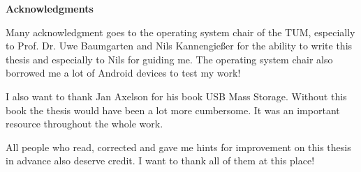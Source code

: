 \clearemptydoublepage
{}
{}	



\vspace*{2cm}

\begin{center}
{\Large \bf Acknowledgments}
\end{center}

\vspace{1cm}

Many acknowledgment goes to the operating system chair of the TUM, especially to Prof. Dr. Uwe Baumgarten and Nils Kannengie{\ss}er for the ability to write this thesis and especially to Nils for guiding me. The operating system chair also borrowed me a lot of Android devices to test my work!

I also want to thank Jan Axelson for his book USB Mass Storage\cite{usb_ms_jan}. Without this book the thesis would have been a lot more cumbersome. It was an important resource throughout the whole work.

All people who read, corrected and gave me hints for improvement on this thesis in advance also deserve credit. I want to thank all of them at this place!